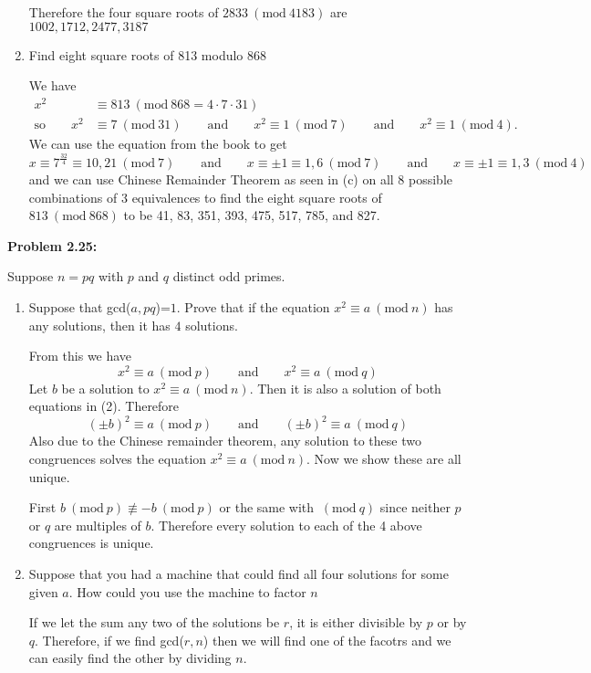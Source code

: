 \documentclass[a4paper, 11pt]{article}
\newcommand{\Mod}[1]{\ (\mathrm{mod}\ #1)}
\begin{document}
\begin{enumerate}[label=(\alph*)]
        Therefore the four square roots of $2833\Mod{4183}$ are $1002,1712,2477,3187$
        
        \item Find eight square roots of 813 modulo 868
        
        We have
        \begin{align*}
            x^2 &\equiv 813 \Mod{868=4\cdot7\cdot31}\\
            \text{so}\qquad x^2 &\equiv 7\Mod{31} \qquad \text{and} \qquad x^2\equiv 1\Mod{7} \qquad \text{and} \qquad x^2\equiv 1\Mod{4}.
        \end{align*}
        We can use the equation from the book to get
        \begin{equation*}
            x\equiv 7^\frac{32}{4} \equiv 10,21 \Mod{7} \qquad \text{and} \qquad x \equiv \pm 1 \equiv 1, 6\Mod{7} \qquad \text{and} \qquad x \equiv \pm 1\equiv 1,3 \Mod{4}
        \end{equation*}
        and we can use Chinese Remainder Theorem as seen in (c) on all 8 possible combinations of 3 equivalences to find the eight square roots of $813\Mod{868}$ to be 41, 83, 351, 393, 475, 517, 785, and 827.
    \end{enumerate}

\noindent\textbf{Problem 2.25:}

    Suppose $n=pq$ with $p$ and $q$ distinct odd primes.
    \begin{enumerate}[label=(\alph*)]
        \item Suppose that gcd($a,pq$)=$1$. Prove that if the equation $x^2\equiv a \Mod{n}$ has any solutions, then it has $4$ solutions.
        
        From this we have
        \begin{equation}
            x^2\equiv a \Mod{p} \qquad \text{and} \qquad x^2\equiv a \Mod{q}
        \end{equation}
        Let $b$ be a solution to $x^2\equiv a \Mod{n}$. Then it is also a solution of both equations in (2). Therefore
        \begin{equation*}
            (\pm b)^2 \equiv a\Mod{p} \qquad \text{and} \qquad (\pm b)^2\equiv a \Mod{q}
        \end{equation*}
        Also due to the Chinese remainder theorem, any solution to these two congruences solves the equation $x^2\equiv a \Mod{n}$. Now we show these are all unique.
        
        First $b \Mod{p} \not\equiv -b\Mod{p}$ or the same with $\Mod{q}$ since neither $p$ or $q$ are multiples of $b$. Therefore every solution to each of the 4 above congruences is unique.
        
        \item Suppose that you had a machine that could find all four solutions for some given $a$. How could you use the machine to factor $n$
        
        If we let the sum any two of the solutions be $r$, it is either divisible by $p$ or by $q$. Therefore, if we find gcd($r,n$) then we will find one of the facotrs and we can easily find the other by dividing $n$. 
    \end{enumerate}
\end{document}
